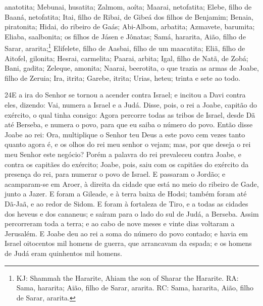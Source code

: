 anatotita; Mebunai, husatita; Zalmom, aoíta; Maarai,
netofatita; Elebe, filho de Baaná, netofatita; Itai, filho de
Ribai, de Gibeá dos filhos de Benjamim; Benaia, piratonita;
Hidai, do ribeiro de Gaás; Abi-Albom, arbatita; Azmavete,
barumita; Eliaba, saalbonita; os filhos de Jásen e Jônatas;
Samá, hararita, Aião, filho de Sarar, ararita;\footnote{KJ:
Shammah the Hararite, Ahiam the son of Sharar the Hararite. RA:
Sama, hararita; Aião, filho de Sarar, ararita. RC: Sama, hararita,
Aião, filho de Sarar, ararita.} Elifelete, filho de Aasbai,
filho de um maacatita; Eliã, filho de Aitofel, gilonita;
Hesrai, carmelita; Paarai, arbita; Igal, filho de
Natã, de Zobá; Bani, gadita; Zeleque, amonita; Naarai,
beerotita, o que trazia as armas de Joabe, filho de Zeruia;
Ira, itrita; Garebe, itrita; Urias, heteu; trinta e
sete ao todo.

\medskip

\lettrine{24} E a ira do Senhor se tornou a acender contra
Israel; e incitou a Davi contra eles, dizendo: Vai, numera a Israel
e a Judá. Disse, pois, o rei a Joabe, capitão do exército, o
qual tinha consigo: Agora percorre todas as tribos de Israel, desde
Dã até Berseba, e numera o povo, para que eu saiba o número do povo.
Então disse Joabe ao rei: Ora, multiplique o Senhor teu Deus a
este povo cem vezes tanto quanto agora é, e os olhos do rei meu
senhor o vejam; mas, por que deseja o rei meu Senhor este negócio?
Porém a palavra do rei prevaleceu contra Joabe, e contra os
capitães do exército; Joabe, pois, saiu com os capitães do exército
da presença do rei, para numerar o povo de Israel. E passaram o
Jordão; e acamparam-se em Aroer, à direita da cidade que está no
meio do ribeiro de Gade, junto a Jazer. E foram a Gileade, e à
terra baixa de Hodsi; também foram até Dã-Jaã, e ao redor de Sidom.
E foram à fortaleza de Tiro, e a todas as cidades dos heveus e
dos cananeus; e saíram para o lado do sul de Judá, a Berseba.
Assim percorreram toda a terra; e ao cabo de nove meses e vinte
dias voltaram a Jerusalém. E Joabe deu ao rei a soma do número
do povo contado; e havia em Israel oitocentos mil homens de guerra,
que arrancavam da espada; e os homens de Judá eram quinhentos mil
homens.

